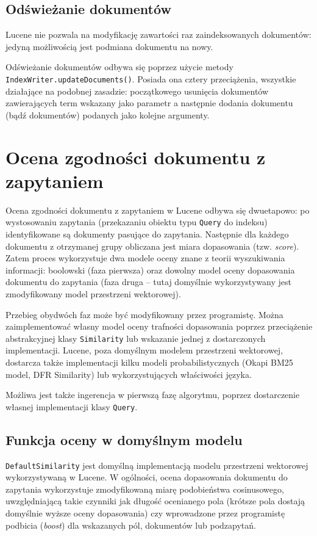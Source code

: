 \subsection{Odświeżanie dokumentów}

Lucene nie pozwala na modyfikację zawartości raz zaindeksowanych dokumentów: jedyną możliwością jest podmiana dokumentu na nowy.

Odświeżanie dokumentów odbywa się poprzez użycie metody \texttt{IndexWriter.updateDocuments()}. Posiada ona cztery przeciążenia, wszystkie działające na podobnej zasadzie: początkowego usunięcia dokumentów zawierających term wskazany jako parametr a następnie dodania dokumentu (bądź dokumentów) podanych jako kolejne argumenty. 

\section{Ocena zgodności dokumentu z zapytaniem}

Ocena zgodności dokumentu z zapytaniem w Lucene odbywa się dwuetapowo: po wystosowaniu zapytania (przekazaniu obiektu typu \texttt{Query} do indeksu) identyfikowane są dokumenty pasujące do zapytania. Następnie dla każdego dokumentu z otrzymanej grupy obliczana jest miara dopasowania (tzw. \emph{score}). Zatem proces wykorzystuje dwa modele oceny znane z teorii wyszukiwania informacji: boolowski (faza pierwsza) oraz dowolny model oceny dopasowania dokumentu do zapytania (faza druga -- tutaj domyślnie wykorzystywany jest zmodyfikowany model przestrzeni wektorowej). 

Przebieg obydwóch faz może być modyfikowany przez programistę. Można zaimplementować własny model oceny trafności dopasowania poprzez przeciążenie abstrakcyjnej klasy \texttt{Similarity} lub wskazanie jednej z dostarczonych implementacji. Lucene, poza domyślnym modelem przestrzeni wektorowej, dostarcza także implementacji kilku modeli probabilistycznych (Okapi BM25 model, DFR Similarity) lub wykorzystujących właściwości języka.

Możliwa jest także ingerencja w pierwszą fazę algorytmu, poprzez dostarczenie własnej implementacji klasy \texttt{Query}.

\subsection{Funkcja oceny w domyślnym modelu}

\texttt{DefaultSimilarity} jest domyślną implementacją modelu przestrzeni wektorowej wykorzystywaną w Lucene. W ogólności, ocena dopasowania dokumentu do zapytania wykorzystuje zmodyfikowaną miarę podobieństwa cosinusowego, uwzględniającą takie czynniki jak długość ocenianego pola (krótsze pola dostają domyślnie wyższe oceny dopasowania) czy wprowadzone przez programistę podbicia (\emph{boost}) dla wskazanych pól, dokumentów lub podzapytań.

